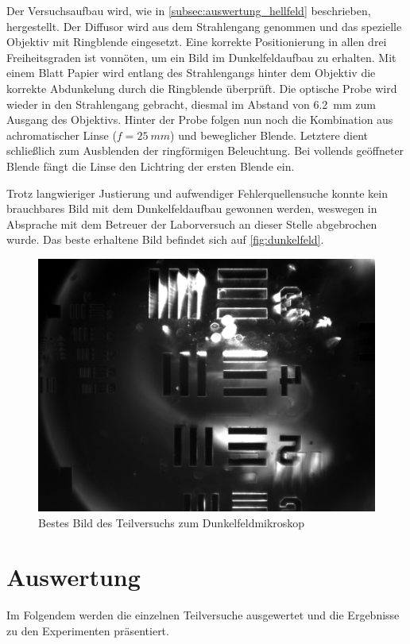 \documentclass[english, ngerman]{scrartcl}
\begin{document}
Der Versuchsaufbau wird, wie in \autoref{subsec:auswertung_hellfeld} beschrieben, hergestellt. Der Diffusor wird aus dem Strahlengang genommen und das spezielle Objektiv mit Ringblende eingesetzt. Eine korrekte Positionierung in allen drei Freiheitsgraden ist vonnöten, um ein Bild im Dunkelfeldaufbau zu erhalten. Mit einem Blatt Papier wird entlang des Strahlengangs hinter dem Objektiv die korrekte Abdunkelung durch die Ringblende überprüft. Die optische Probe wird wieder in den Strahlengang gebracht, diesmal im Abstand von \SI{6.2}{mm} zum Ausgang des Objektivs. Hinter der Probe folgen nun noch die Kombination aus achromatischer Linse
($f = \SI{25}{mm}$) und beweglicher Blende. Letztere dient schließlich zum Ausblenden der ringförmigen Beleuchtung. Bei vollends geöffneter Blende fängt die Linse den Lichtring der ersten Blende ein.

Trotz langwieriger Justierung und aufwendiger Fehlerquellensuche konnte kein brauchbares Bild mit dem Dunkelfeldaufbau gewonnen werden, weswegen in Absprache mit dem Betreuer der Laborversuch an dieser Stelle abgebrochen wurde. Das beste erhaltene Bild befindet sich auf \autoref{fig:dunkelfeld}.
%
\begin{figure}[H]
    \centering
    \begin{samepage}
        \includegraphics[width=0.6\linewidth]{fig/Versuch4/dunkelfeld_test.jpg}
        \caption[Dunkelfeld]{Bestes Bild des Teilversuchs zum Dunkelfeldmikroskop}
        \label{fig:dunkelfeld}
    \end{samepage}
\end{figure}



\section{Auswertung}
\label{sec:auswertung}

Im Folgendem werden die einzelnen Teilversuche ausgewertet und die Ergebnisse zu den Experimenten präsentiert.
\end{document}
